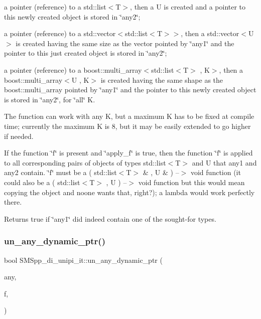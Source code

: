 \begin{DoxyItemize}
\item a pointer (reference) to a std\+::list$<$\+T$>$, then a U is created and a pointer to this newly created object is stored in \char`\"{}any2\char`\"{};
\item a pointer (reference) to a std\+::vector$<$std\+::list$<$\+T$>$$>$, then a std\+::vector$<$\+U$>$ is created having the same size as the vector pointed by \char`\"{}any1\char`\"{} and the pointer to this just created object is stored in \char`\"{}any2\char`\"{};
\item a pointer (reference) to a boost\+::multi\+\_\+array$<$std\+::list$<$\+T$>$ , K$>$, then a boost\+::multi\+\_\+array$<$\+U , K$>$ is created having the same shape as the boost\+::multi\+\_\+array pointed by \char`\"{}any1\char`\"{} and the pointer to this newly created object is stored in \char`\"{}any2\char`\"{}, for \char`\"{}all\char`\"{} K.
\end{DoxyItemize}

The function can work with any K, but a maximum K has to be fixed at compile time; currently the maximum K is 8, but it may be easily extended to go higher if needed.

If the function \char`\"{}f\char`\"{} is present and \char`\"{}apply\+\_\+f\char`\"{} is true, then the function \char`\"{}f\char`\"{} is applied to all corresponding pairs of objects of types std\+::list$<$\+T$>$ and U that any1 and any2 contain. \char`\"{}f\char`\"{} must be a ( std\+::list$<$\+T$>$ \& , U \& ) --$>$ void function (it could also be a ( std\+::list$<$\+T$>$ , U ) --$>$ void function but this would mean copying the object and noone wants that, right?); a lambda would work perfectly there.

Returns true if \char`\"{}any1\char`\"{} did indeed contain one of the sought-\/for types. \mbox{\label{group__boost__any__stuff_ga89921fc8079edf05986c4936cc6044e5}} 
\subsubsection{\texorpdfstring{un\+\_\+any\+\_\+dynamic\+\_\+ptr()}{un\_any\_dynamic\_ptr()}}
{\footnotesize\ttfamily bool S\+M\+Spp\+\_\+di\+\_\+unipi\+\_\+it\+::un\+\_\+any\+\_\+dynamic\+\_\+ptr (\begin{DoxyParamCaption}\item[{boost\+::any \&}]{any,  }\item[{F}]{f,  }\item[{\mbox{\hyperlink{struct_s_m_spp__di__unipi__it_1_1un__any__type}{un\+\_\+any\+\_\+type}}$<$ T $>$}]{ }\end{DoxyParamCaption})}

